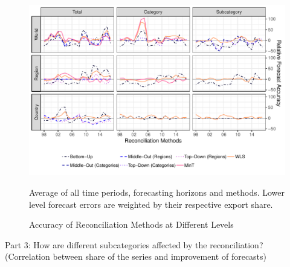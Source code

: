 \documentclass[a4paper,fleqn,11pt]{article}
\begin{document}
 \begin{figure}[H]
	\includegraphics[width=\textwidth]{fig/fig_eval_rmse_time}
	\caption{Accuracy of Reconciliation Methods at Different Levels}
	\footnotesize{Average of all time periods, forecasting horizons and methods. Lower level forecast errors are weighted by their respective export share.}
\end{figure}
 
Part 3: How are different subcategories affected by the reconciliation? (Correlation between share of the series and improvement of forecasts)
\end{document}
